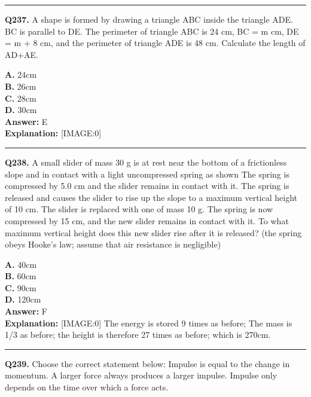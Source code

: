\documentclass[12pt]{article}
\begin{document}
\hrule
\vspace{1em}


\noindent
\textbf{Q237.} A shape is formed by drawing a triangle ABC inside the triangle ADE. BC is parallel to DE. The perimeter of triangle ABC is 24 cm, BC = m cm, DE = m + 8 cm, and the perimeter of triangle ADE is 48 cm.
Calculate the length of AD+AE.



\textbf{A.} 24cm \\
\textbf{B.} 26cm \\
\textbf{C.} 28cm \\
\textbf{D.} 30cm \\

\textbf{Answer:} E \\
\textbf{Explanation:} [IMAGE:0]

\hrule
\vspace{1em}


\noindent
\textbf{Q238.} A small slider of mass 30 g is at rest near the bottom of a frictionless slope and in contact with a light uncompressed spring as shown
The spring is compressed by 5.0 cm and the slider remains in contact with it.
The spring is released and causes the slider to rise up the slope to a maximum vertical height of 10 cm.
The slider is replaced with one of mass 10 g.
The spring is now compressed by 15 cm, and the new slider remains in contact with it. To what maximum vertical height does this new slider rise after it is released?
(the spring obeys Hooke’s law; assume that air resistance is negligible)



\textbf{A.} 40cm \\
\textbf{B.} 60cm \\
\textbf{C.} 90cm \\
\textbf{D.} 120cm \\

\textbf{Answer:} F \\
\textbf{Explanation:} [IMAGE:0]
The energy is stored 9 times as before; The mass is 1/3 as before; the height is therefore 27 times as before; which is 270cm.

\hrule
\vspace{1em}


\noindent
\textbf{Q239.} Choose the correct statement below:
Impulse is equal to the change in momentum.
A larger force always produces a larger impulse.
Impulse only depends on the time over which a force acts.
\end{document}
